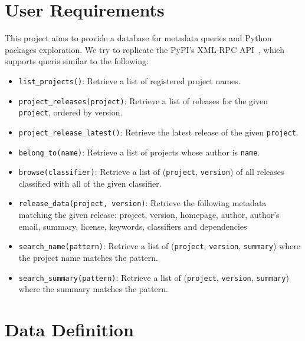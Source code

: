 \documentclass[a4paper,12pt]{article}
\begin{document}
\section{User Requirements}
This project aims to provide a database for metadata queries and Python packages
exploration.  We try to replicate the PyPI's XML-RPC API~\cite{xmlrpc},
which supports queris similar to the following:
\begin{itemize}
  \item \verb|list_projects()|: Retrieve a list of registered project names.
  \item \verb|project_releases(project)|: Retrieve a list of releases for
    the given \verb|project|, ordered by version.
  \item \verb|project_release_latest()|: Retrieve the latest release
    of the given \verb|project|.
  \item \verb|belong_to(name)|: Retrieve a list of projects whose author
    is \verb|name|.
  \item \verb|browse(classifier)|: Retrieve a list of (\verb|project|,
    \verb|version|) of all releases classified with all of the given classifier.
  \item \verb|release_data(project, version)|: Retrieve the following metadata
    matching the given release: project, version, homepage, author,
    author's email, summary, license, keywords, classifiers and dependencies
  \item \verb|search_name(pattern)|: Retrieve a list of (\verb|project|,
    \verb|version|, \verb|summary|) where the project name matches the pattern.
  \item \verb|search_summary(pattern)|: Retrieve a list of (\verb|project|,
    \verb|version|, \verb|summary|) where the summary matches the pattern.
\end{itemize}

\section{Data Definition}
\end{document}
